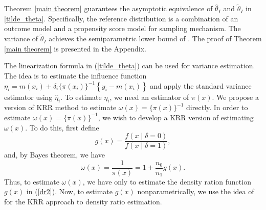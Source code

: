 \documentclass[12pt]{article}
\newcommand{\bx}{{x}}
\def\wh{\widehat}
\def\wt{\widetilde}
\newcommand{\hf}[1]{\textcolor{blue}{\textbf{[Hengfang: #1]}}}
\newcommand{\jk}[1]{\textcolor{red}{\textbf{[JK: #1]}}}
\begin{document}
Theorem \ref{main theorem} guarantees the asymptotic equivalence of $\wh{\theta}_{I}$ and $\wt{\theta}_{I}$ in \eqref{tilde_theta}. Specifically, the reference distribution is a combination of an outcome model and a propensity score model for sampling mechanism. The variance of $\wt{\theta}_I$ achieves the semiparametric lower bound of \citet{robins94}. 
The proof of Theorem \ref{main theorem} is presented in the Appendix.




The linearization formula in (\ref{tilde_theta}) can be used for  variance estimation. The idea is to estimate the influence function 
$\eta_i = m(\bx_{i}) + \delta_{i} \{ \pi(\bx_{i})\}^{-1}  \left\{ y_{i} - m(\bx_{i}) \right\} $ and apply the standard variance estimator using $\hat{\eta}_i$. To estimate $\eta_i$, we need an estimator of $\pi(x)$. We propose a version of KRR method to estimate $\omega(x) = \{ \pi(x) \}^{-1}$ directly.  
In order to estimate $\omega(x) = \{ \pi(x) \}^{-1}$, we wish to develop a {KRR} version of estimating $\omega (x)$. To do this, first define 
\begin{equation} 
 g( x) = \frac{ f(x \mid  \delta =0 ) }{ f( x \mid  \delta = 1 ) },
\label{dr2}
\end{equation} 
and, by Bayes theorem, we have  
$$ \omega(x)= \frac{1}{ \pi(x) }  = 1+ \frac{n_0}{n_1}  g(x).
$$
Thus, to estimate $\omega(x)$, we have only to estimate the density ration function $g(x)$ in (\ref{dr2}). 
Now, to estimate $g(x)$ nonparametrically, we use the idea of \cite{nguyen2010} for  the KRR approach to density ratio estimation. 


\end{document}
